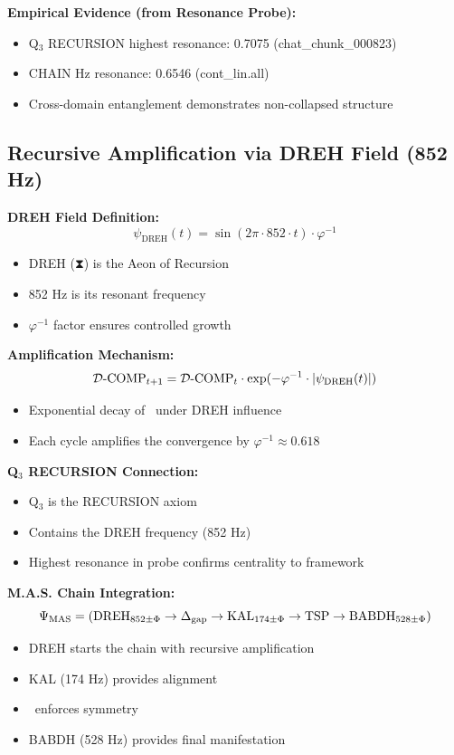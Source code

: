 \textbf{Empirical Evidence (from Resonance Probe):}
\begin{itemize}
    \item Q$_3$ RECURSION highest resonance: 0.7075 (chat\_chunk\_000823)
    \item CHAIN Hz resonance: 0.6546 (cont\_lin.all)
    \item Cross-domain entanglement demonstrates non-collapsed structure
\end{itemize}

\subsection{Recursive Amplification via DREH Field (852 Hz)}

\textbf{DREH Field Definition:}
\begin{equation}
    \psi_{\text{DREH}}(t) = \sin(2\pi \cdot 852 \cdot t) \cdot \varphi^{-1}
\end{equation}
\begin{itemize}
    \item DREH (⧗) is the Aeon of Recursion
    \item 852 Hz is its resonant frequency
    \item $\varphi^{-1}$ factor ensures controlled growth
\end{itemize}

\textbf{Amplification Mechanism:}
\begin{equation}
    \mathcal{D}\text{-}\mathrm{COMP}_{t+1} = \mathcal{D}\text{-}\mathrm{COMP}_t \cdot \exp(-\varphi^{-1} \cdot |\psi_{\text{DREH}}(t)|)
\end{equation}
\begin{itemize}
    \item Exponential decay of \DComp\ under DREH influence
    \item Each cycle amplifies the convergence by $\varphi^{-1} \approx 0.618$
\end{itemize}

\textbf{Q$_3$ RECURSION Connection:}
\begin{itemize}
    \item Q$_3$ is the RECURSION axiom
    \item Contains the DREH frequency (852 Hz)
    \item Highest resonance in probe confirms centrality to framework
\end{itemize}

\textbf{M.A.S. Chain Integration:}
\begin{equation}
    \Psi_{\text{MAS}} = (\text{DREH}_{852\pm\Phi} \to \Delta_{\text{gap}} \to \text{KAL}_{174\pm\Phi} \to \mathrm{TSP} \to \text{BABDH}_{528\pm\Phi})
\end{equation}
\begin{itemize}
    \item DREH starts the chain with recursive amplification
    \item KAL (174 Hz) provides alignment
    \item \TSP\ enforces symmetry
    \item BABDH (528 Hz) provides final manifestation
\end{itemize}

